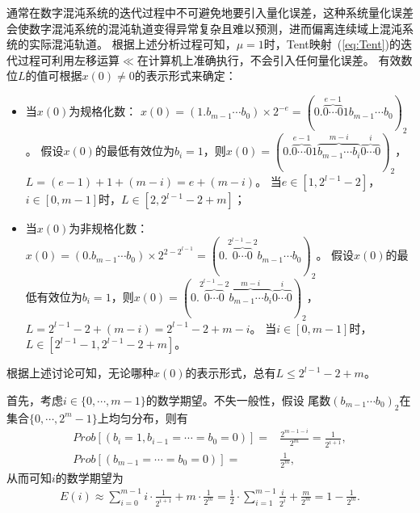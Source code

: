 通常在数字混沌系统的迭代过程中不可避免地要引入量化误差，这种系统量化误差会使数字混沌系统的混沌轨道变得异常复杂且难以预测，进而偏离连续域上混沌系统的实际混沌轨道。
根据上述分析过程可知，$\mu=1$时，Tent映射~(\ref{eq:Tent})的迭代过程可利用左移运算$\ll$在计算机上准确执行，不会引入任何量化误差。
有效数位$L$的值可根据$x(0)\neq 0$的表示形式来确定：
\begin{itemize}

\item 当$x(0)$为规格化数：
$x(0)=(1.b_{m-1}\cdots b_{0})\times 2^{-e}
=(0.\overbrace{0\cdots 0}^{e-1}1b_{m-1}\cdots b_{0})_{2}$。
假设$x(0)$的最低有效位为$b_{i}=1$，则$x(0)=(0.\overbrace{0\cdots 0}^{e-1}1\overbrace{b_{m-1}\cdots
b_{i}}^{m-i}\overbrace{0\cdots 0}^{i})_{2}$，$L=(e-1)+1+(m-i)=e+(m-i)$。
当$e\in [1,2^{l-1}-2]$，$i\in [0,m-1]$时，$L\in [2, 2^{l-1}-2+m]$；

\item 当$x(0)$为非规格化数：
$x(0)=(0.b_{m-1}\cdots b_{0})\times 2^{2-2^{l-1}}
=(0.\overbrace{0\cdots 0}^{2^{l-1}-2}b_{m-1}\cdots b_{0})_{2}$。
假设$x(0)$的最低有效位为$b_{i}=1$，则$x(0)=(0.\overbrace{0\cdots 0}^{2^{l-1}-2}\overbrace{b_{m-1}\cdots
b_{i}}^{m-i}\overbrace{0\cdots 0}^{i})_{2}$，$L=2^{l-1}-2+(m-i)=2^{l-1}-2+m-i$。
当$i\in [0,m-1]$时，$L\in [2^{l-1}-1,2^{l-1}-2+m]$。
\end{itemize}
根据上述讨论可知，无论哪种$x(0)$的表示形式，总有$L \le 2^{l-1}-2+m$。

首先，考虑$i\in \{0,\cdots ,m-1\}$的数学期望。不失一般性，假设
尾数$(b_{m-1}\cdots b_{0})_{2}$在集合$\{0,\cdots ,2^{m}-1\}$上均匀分布，则有
\begin{align*}
\mathit{Prob}[(b_{i}=1,b_{i-1}=\cdots =b_{0}=0)] = & \frac{2^{m-1-i}}{2^{m}} = \frac{1}{2^{i+1}},\\
\mathit{Prob}[(b_{m-1}=\cdots =b_{0}=0)] = & \frac{1}{2^{m}},
\end{align*}
从而可知$i$的数学期望为
\begin{eqnarray*}
E(i) \approx \sum_{i=0}^{m-1} i\cdot \frac{1}{2^{i+1}} + m\cdot \frac{1}{2^{m}}
= \frac{1}{2}\cdot \sum_{i=1}^{m-1} \frac{i}{2^{i}} + \frac{m}{2^{m}}
= 1 - \frac{1}{2^{m}}.
\end{eqnarray*}

